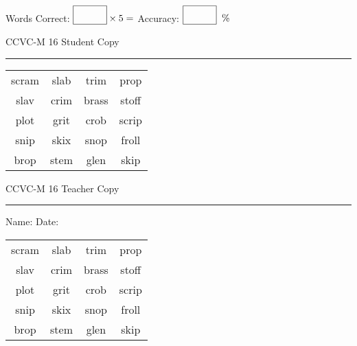 \documentclass{memoir}
\begin{document}
\small

Words Correct: $\fbox{\phantom{\huge 100}} \times 5 = $ Accuracy: $\fbox{\phantom{\huge 100}}\;\; \%$ 

\vfill

\newpage


\footnotesize \noindent
CCVC-M 16 \hfill Student Copy
\smallskip
\hrule

\Large

\setlength{\tabcolsep}{14pt}
\def\arraystretch{3}

{\selectfont


\begin{vplace}[0.5]
\begin{center}
\begin{tabular}{cccc}
scram & slab             & trim & prop \\
slav & crim & brass       & stoff \\
plot & grit      & crob & scrip \\
snip & skix & snop & froll \\
brop   & stem & glen & skip \\
\end{tabular}
\end{center}
\end{vplace}

}

\newpage

\footnotesize \noindent
CCVC-M 16 \hfill Teacher Copy
\smallskip
\hrule

\small

\vfill

\noindent
Name: \underline{\hspace{1.75in}} \hfill Date: \underline{\hspace{1in}}

\Large

{\selectfont


\begin{vplace}[0.5]
\begin{center}
\begin{tabular}{cccc}
scram & slab             & trim & prop \\
slav & crim & brass       & stoff \\
plot & grit      & crob & scrip \\
snip & skix & snop & froll \\
brop   & stem & glen & skip \\
\end{tabular}
\end{center}
\end{vplace}



}
\end{document}
